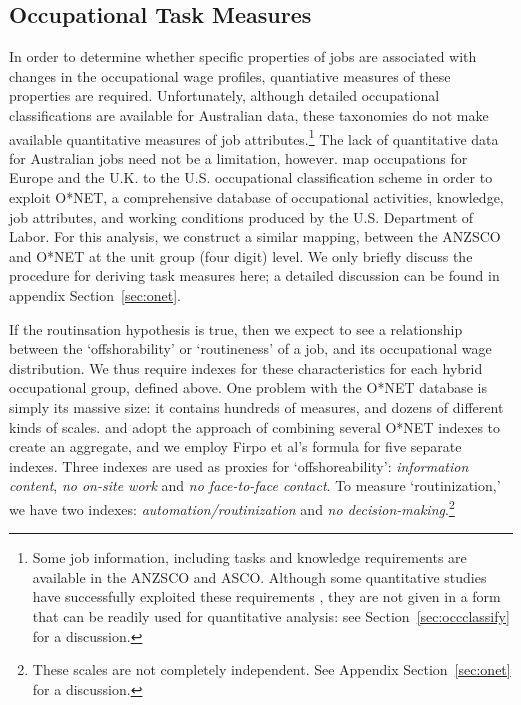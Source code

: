 \subsection{Occupational Task Measures}

In order to determine whether specific properties of jobs are associated with changes in the occupational wage profiles, quantiative measures of these properties are required. Unfortunately, although detailed occupational classifications are available for Australian data, these taxonomies do not make available quantitative measures of job attributes.\footnote{Some job information, including tasks and knowledge requirements are available in the ANZSCO and ASCO. Although some quantitative studies have successfully exploited these requirements \citep[e.g.]{Barnes2002}, they are not given in a form that can be readily used for quantitative analysis: see Section~\ref{sec:occclassify} for a discussion.} The lack of quantitative data for Australian jobs need not be a limitation, however. \citet{Goos2009} map occupations for Europe and the U.K. to the U.S. occupational classification scheme in order to exploit O*NET, a comprehensive database of occupational activities, knowledge, job attributes, and working conditions produced by the U.S. Department of Labor. For this analysis, we construct a similar mapping, between the ANZSCO and O*NET at the unit group (four digit) level. We only briefly discuss the procedure for deriving task measures here; a detailed discussion can be found in appendix Section~\ref{sec:onet}.

If the routinsation hypothesis is true, then we expect to see a relationship between the `offshorability' or `routineness' of a job, and its occupational wage distribution. We thus require indexes for these characteristics for each hybrid occupational group, defined above. One problem with the O*NET database is simply its massive size: it contains hundreds of measures, and dozens of different kinds of scales. \citet{Jensen2010} and \citet{Firpo2011} adopt the approach of combining several O*NET indexes to create an aggregate, and we employ Firpo et al's formula for five separate indexes. Three indexes are used as proxies for `offshoreability': {\em information content}, {\em no on-site work} and {\em no face-to-face contact}. To measure `routinization,' we have two indexes: {\em automation/routinization} and {\em no decision-making}.\footnote{These scales are not completely independent. See Appendix Section~\ref{sec:onet} for a discussion.}

